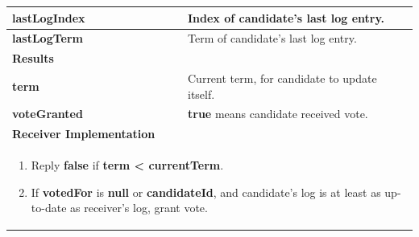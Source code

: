 {\begin{tabular}{|l|p{9cm}|}
        \hline
        \textbf{lastLogIndex} & Index of candidate's last log entry. \\
        \hline
        \textbf{lastLogTerm} & Term of candidate's last log entry. \\
        \hline
        \rowcolor{OliveGreen!10} \textbf{Results} &  \\
        \hline
        \textbf{term} & Current term, for candidate to update itself. \\
        \hline
        \textbf{voteGranted} & \textbf{true} means candidate received vote. \\
        \hline
        \rowcolor{OliveGreen!10} \textbf{Receiver Implementation} & \\
        \hline
        \multicolumn{2}{|p{9cm}|}{%
            \parbox{11cm}{%
                \begin{enumerate}
                    \item Reply \textbf{false} if \textbf{term < currentTerm}.
                    \item If \textbf{votedFor} is \textbf{null} or \textbf{candidateId}, and candidate's log is at least as up-to-date as receiver's log, grant vote.
                \end{enumerate}
            }
        } \\
        \hline
    
    \end{tabular}
    }
\newpage 

